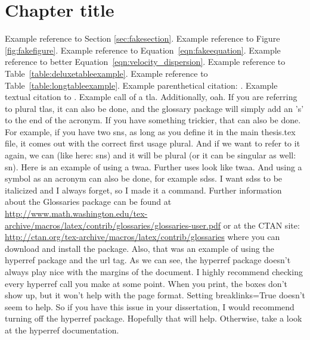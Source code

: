\chapter{Chapter title}
\label{sec:firstchap}
\thispagestyle{myheadings}

\glsresetall

Example reference to Section \ref{sec:fakesection}.  Example reference to Figure \ref{fig:fakefigure}.  Example reference to Equation~\ref{eqn:fakeequation}.  Example reference to better Equation~\ref{eqn:velocity_dispersion}.  Example reference to Table~\ref{table:deluxetableexample}.  Example reference to Table~\ref{table:longtableexample}.  Example parenthetical citation: \citep[e.g][for example]{gosling_1993}.   Example textual citation to \citet[][]{gosling_1993}.  Example call of a \gls{tla}.  Additionally, \gls{oah}.  If you are referring to plural \glspl{tla}, it can also be done, and the glossary package will simply add an 's' to the end of the acronym.  If you have something trickier, that can also be done.  For example, if you have two \glspl{sn}, as long as you define it in the main thesis.tex file, it comes out with the correct first usage plural.  And if we want to refer to it again, we can (like here:  \glspl{sn}) and it will be plural (or it can be singular as well:  \gls{sn}).  Here is an example of using a \gls{twaa}.  Further uses look like \gls{twaa}.  And using a symbol as an acronym can also be done, for example \gls{sdss}.  I want \gls{sdss} to be italicized and I always forget, so I made it a command.  Further information about the Glossaries package can be found at \url{http://www.math.washington.edu/tex-archive/macros/latex/contrib/glossaries/glossaries-user.pdf} or at the CTAN site: \url{http://ctan.org/tex-archive/macros/latex/contrib/glossaries} where you can download and install the package.  Also, that was an example of using the hyperref package and the url tag.  As we can see, the hyperref package doesn't always play nice with the margins of the document.  I highly recommend checking every hyperref call you make at some point.  When you print, the boxes don't show up, but it won't help with the page format.  Setting breaklinks=True doesn't seem to help.  So if you have this issue in your dissertation, I would recommend turning off the hyperref package.  Hopefully that will help.  Otherwise, take a look at the hyperref documentation.

